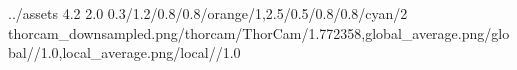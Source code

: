 \TrioComparisonFigure
        {../assets}
        {4.2}
        {2.0}
        {0.3/1.2/0.8/0.8/orange/1,2.5/0.5/0.8/0.8/cyan/2}
        {thorcam_downsampled.png/thorcam/ThorCam/1.772358,global_average.png/global//1.0,local_average.png/local//1.0}
